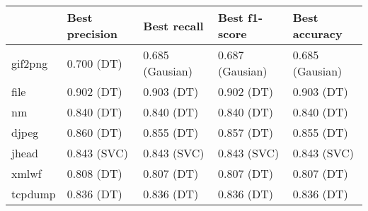 \begin{tabular}{lllll}
\toprule
{} &        Best precision &           Best recall &         Best f1-score &         Best accuracy \\
\midrule
gif2png &  0.700 (DT) &       0.685 (Gausian) &       0.687 (Gausian) &       0.685 (Gausian) \\
file    &  0.902 (DT) &  0.903 (DT) &  0.902 (DT) &  0.903 (DT) \\
nm      &  0.840 (DT) &  0.840 (DT) &  0.840 (DT) &  0.840 (DT) \\
djpeg   &  0.860 (DT) &  0.855 (DT) &  0.857 (DT) &  0.855 (DT) \\
jhead   &           0.843 (SVC) &           0.843 (SVC) &           0.843 (SVC) &           0.843 (SVC) \\
xmlwf   &  0.808 (DT) &  0.807 (DT) &  0.807 (DT) &  0.807 (DT) \\
tcpdump &  0.836 (DT) &  0.836 (DT) &  0.836 (DT) &  0.836 (DT) \\
\bottomrule
\end{tabular}
